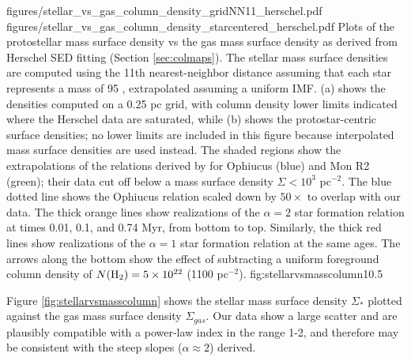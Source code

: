 \documentclass[twocolumn]{aastex61}
\begin{document}
\FigureTwo
{figures/stellar_vs_gas_column_density_gridNN11_herschel.pdf}
{figures/stellar_vs_gas_column_density_starcentered_herschel.pdf}
{Plots of the protostellar mass surface density vs the gas mass surface density
as derived from Herschel SED fitting (Section \ref{sec:colmaps}).  The stellar
mass surface densities are computed using the 11th
nearest-neighbor distance assuming that each star represents
a mass of 95 \msun, extrapolated assuming a uniform IMF.  (a) shows the
densities computed on a 0.25 pc grid, with column density lower limits
indicated where the Herschel data are saturated,
while (b) shows
the protostar-centric surface densities; no lower limits are included in this
figure because interpolated mass surface densities are used instead.  The
shaded regions
show the extrapolations of the relations derived by \citet{Gutermuth2011a}
for Ophiucus (blue) and Mon R2 (green); their data cut off below a mass
surface density $\Sigma < 10^3$ \msun pc$^{-2}$. 
The blue dotted line shows the Ophiucus relation scaled down by
$50\times$ to overlap with our data.
The thick orange lines show realizations of the \citet{Gutermuth2011a} $\alpha=2$ star
formation relation at times 0.01, 0.1, and 0.74 Myr, from bottom to top.
Similarly, the thick red lines show realizations of the $\alpha=1$ star
formation relation at the same ages.
The arrows along
the bottom show the effect of subtracting a uniform foreground column
density of $N(\textrm{H}_{2})=5\times10^{22}$ \persc (1100 \msun pc$^{-2}$).
}
{fig:stellarvsmasscolumn}{1}{0.5\textwidth}

Figure \ref{fig:stellarvsmasscolumn} shows the stellar mass surface density
$\Sigma_*$ plotted against the gas mass surface density $\Sigma_{gas}$.
Our data show a large scatter and are plausibly compatible with a
power-law index in the range 1-2, and therefore may be consistent with the
steep slopes ($\alpha\approx2$) \citet{Gutermuth2011a} derived.
\end{document}
